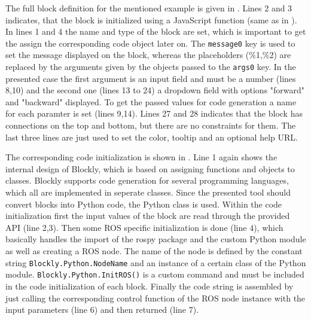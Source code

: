 The full block definition for the mentioned example is given in . Lines 2 and 3 indicates, that the block is initialized using a JavaScript function (same as in ). In lines 1 and 4 the name and type of the block are set, which is important to get the assign the corresponding code object later on. The \lstinline!message0! key is used to set the message displayed on the block, whereas the placeholders (\%1,\%2) are replaced by the arguments given by the objects passed to the \lstinline!args0! key. In the presented case the first argument is an input field and must be a number (lines 8,10) and the second one (lines 13 to 24) a dropdown field with options "forward" and "backward" displayed. To get the passed values for code generation a name for each paramter is set (lines 9,14). Lines 27 and 28 indicates that the block has connections on the top and bottom, but there are no constraints for them. The last three lines are just used to set the color, tooltip and an optional help URL. \\

\begin{figure}[htbp]
	
\end{figure}

\begin{figure}[htbp]
	
\end{figure}

The corresponding code initialization is shown in . Line 1 again shows the internal design of Blockly, which is based on assigning functions and objects to classes. Blockly supports code generation for several programming languages, which all are implemented in seperate classes. Since the presented tool should convert blocks into Python code, the Python class is used. Within the code initialization first the input values of the block are read through the provided API (line 2,3). Then some ROS specific initialization is done (line 4), which basically handles the import of the rospy package and the custom Python module as well as creating a ROS node. The name of the node is defined by the constant string \lstinline!Blockly.Python.NodeName! and an instance of a certain class of the Python module. \lstinline!Blockly.Python.InitROS()! is a custom command and must be included in the code initialization of each block. Finally the code string is assembled by just calling the corresponding control function of the ROS node instance with the input parameters (line 6) and then returned (line 7).

